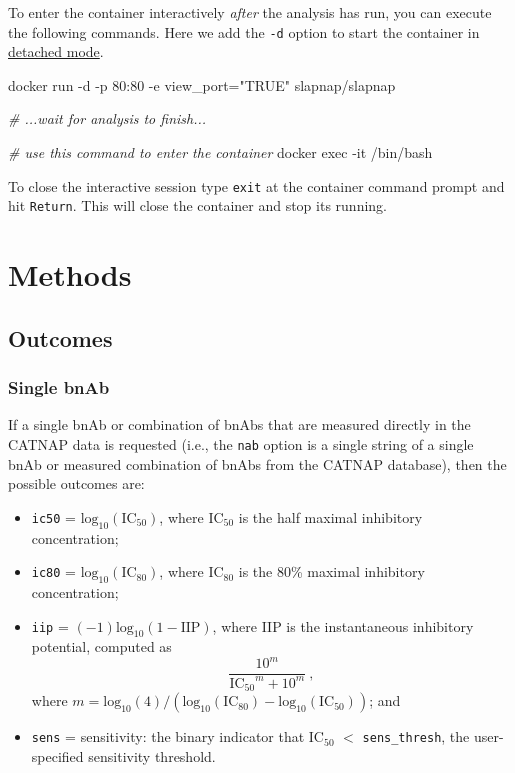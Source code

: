 \documentclass[]{article}
\newenvironment{Shaded}{\begin{snugshade}}{\end{snugshade}}
\newcommand{\StringTok}[1]{\textcolor[rgb]{0.31,0.60,0.02}{#1}}
\newcommand{\CommentTok}[1]{\textcolor[rgb]{0.56,0.35,0.01}{\textit{#1}}}
\newcommand{\ExtensionTok}[1]{#1}
\newcommand{\NormalTok}[1]{#1}
\providecommand{\tightlist}{%
  \setlength{\itemsep}{0pt}\setlength{\parskip}{0pt}}
\begin{document}
To enter the container interactively \emph{after} the analysis has run,
you can execute the following commands. Here we add the \texttt{-d}
option to start the container in
\href{https://docs.docker.com/engine/reference/run/\#detached--d}{detached
mode}.

\begin{Shaded}
\begin{Highlighting}[]
\ExtensionTok{docker}\NormalTok{ run -d -p 80:80 -e view_port=}\StringTok{"TRUE"}\NormalTok{ slapnap/slapnap}

\CommentTok{# ...wait for analysis to finish...}

\CommentTok{# use this command to enter the container}
\ExtensionTok{docker}\NormalTok{ exec -it /bin/bash}
\end{Highlighting}
\end{Shaded}

To close the interactive session type \texttt{exit} at the container
command prompt and hit \texttt{Return}. This will close the container
and stop its running.

\section{Methods}\label{sec:methods}

\subsection{Outcomes}\label{sec:outcomedefs}

\subsubsection{Single bnAb}\label{single-bnab}

If a single bnAb or combination of bnAbs that are measured directly in
the CATNAP data is requested (i.e., the \texttt{nab} option is a single
string of a single bnAb or measured combination of bnAbs from the CATNAP
database), then the possible outcomes are:

\begin{itemize}
\tightlist
\item
  \texttt{ic50} = \(\mbox{log}_{10}(\mbox{IC}_{50})\), where IC\(_{50}\)
  is the half maximal inhibitory concentration;
\item
  \texttt{ic80} = \(\mbox{log}_{10}(\mbox{IC}_{80})\), where IC\(_{80}\)
  is the 80\% maximal inhibitory concentration;
\item
  \texttt{iip} = \((-1)\mbox{log}_{10}(1 - \mbox{IIP})\), where IIP
  \citep[\citet{wagh2016optimal}]{shen2008dose} is the instantaneous
  inhibitory potential, computed as
  \[ \frac{10^m}{\mbox{IC$_{50}$}^m + 10^m} \ , \] where
  \(m = \mbox{log}_{10}(4) / (\mbox{log}_{10}(\mbox{IC}_{80}) - \mbox{log}_{10}(\mbox{IC}_{50}))\);
  and
\item
  \texttt{sens} = sensitivity: the binary indicator that IC\(_{50}\)
  \(<\) \texttt{sens\_thresh}, the user-specified sensitivity threshold.
\end{itemize}
\end{document}
